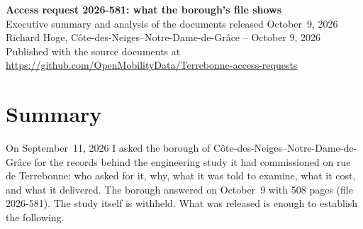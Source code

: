 \documentclass[11pt,letterpaper]{article}
\newcommand{\repourl}{https://github.com/OpenMobilityData/Terrebonne-access-requests}
\newcommand{\repo}[1]{\href{\repourl}{#1}}
\begin{document}
\begin{center}
{\Large\bfseries Access request 2026-581: what the borough's file shows}\\[0.4em]
{\large Executive summary and analysis of the documents released October~9, 2026}\\[0.6em]
Richard Hoge, C\^ote-des-Neiges--Notre-Dame-de-Gr\^ace -- October 9, 2026\\
Published with the source documents at \repo{\repourl}
\end{center}

\section*{Summary}

On September~11, 2026 I asked the borough of C\^ote-des-Neiges--Notre-Dame-de-Gr\^ace
for the records behind the engineering study it had commissioned on rue de
Terrebonne: who asked for it, why, what it was told to examine, what it cost,
and what it delivered. The borough answered on October~9 with 508 pages
(file 2026-581). The study itself is withheld. What was released is enough
to establish the following.
\end{document}
